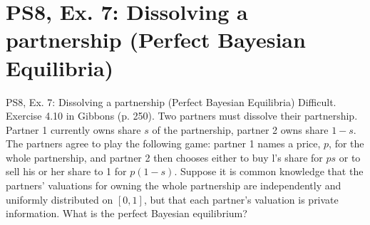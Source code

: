 \section{PS8, Ex. 7: Dissolving a partnership (Perfect Bayesian Equilibria)}

\begin{frame}{PS8, Ex. 7: Dissolving a partnership (Perfect Bayesian Equilibria)}
    Difficult. Exercise 4.10 in Gibbons (p. 250). Two partners must dissolve their partnership. Partner 1 currently owns share $s$ of the partnership, partner 2 owns share $1-s$. The partners agree to play the following game: partner 1 names a price, $p$, for the whole partnership, and partner 2 then chooses either to buy l's share for $ps$ or to sell his or her share to 1 for $p(1-s)$. Suppose it is common knowledge that the partners' valuations for owning the whole partnership are independently and uniformly distributed on $[0,1]$, but that each partner's valuation is private information. What is the perfect Bayesian equilibrium?
    \vfill\null
\end{frame}

